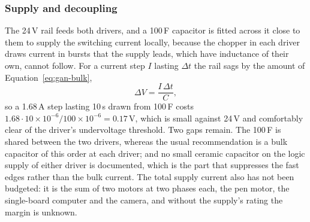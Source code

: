
\subsubsection{Supply and decoupling}
\label{sec:gan-supply}

The 24\,V rail feeds both drivers, and a 100\,\textmu F capacitor is fitted across it close to them to supply the switching current locally, because the chopper in each driver draws current in bursts that the supply leads, which have inductance of their own, cannot follow.
For a current step $I$ lasting $\Delta t$ the rail sags by the amount of Equation~\ref{eq:gan-bulk},
\begin{equation}
\Delta V=\frac{I\,\Delta t}{C},
\label{eq:gan-bulk}
\end{equation}
so a 1.68\,A step lasting 10\,\textmu s drawn from 100\,\textmu F costs $1.68\cdot10\times10^{-6}/100\times10^{-6}=0.17$\,V, which is small against 24\,V and comfortably clear of the driver's undervoltage threshold.
Two gaps remain.
The 100\,\textmu F is shared between the two drivers, whereas the usual recommendation is a bulk capacitor of this order at each driver; and no small ceramic capacitor on the logic supply of either driver is documented, which is the part that suppresses the fast edges rather than the bulk current.
The total supply current also has not been budgeted: it is the sum of two motors at two phases each, the pen motor, the single-board computer and the camera, and without the supply's rating the margin is unknown.


